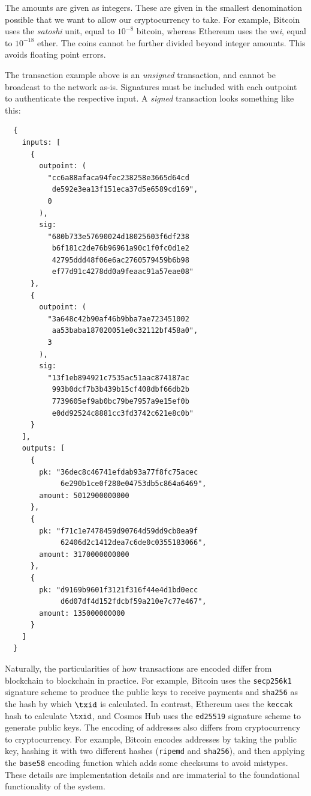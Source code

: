 The amounts are given as integers. These are given in
the smallest denomination possible that we want to allow our cryptocurrency to take.
For example, Bitcoin uses the \emph{satoshi} unit, equal to
$10^{-8}$ bitcoin, whereas Ethereum uses the \emph{wei}, equal to
$10^{-18}$ ether. The coins cannot be further divided beyond integer amounts.
This avoids floating point errors.

The transaction example above is an \emph{unsigned} transaction, and cannot be
broadcast to the network as-is. Signatures must be included with each outpoint
to authenticate the respective input. A \emph{signed} transaction looks something
like this:

\begin{Verbatim}
  {
    inputs: [
      {
        outpoint: (
          "cc6a88afaca94fec238258e3665d64cd
           de592e3ea13f151eca37d5e6589cd169",
          0
        ),
        sig:
          "680b733e57690024d18025603f6df238
           b6f181c2de76b96961a90c1f0fc0d1e2
           42795ddd48f06e6ac2760579459b6b98
           ef77d91c4278dd0a9feaac91a57eae08"
      },
      {
        outpoint: (
          "3a648c42b90af46b9bba7ae723451002
           aa53baba187020051e0c32112bf458a0",
          3
        ),
        sig:
          "13f1eb894921c7535ac51aac874187ac
           993b0dcf7b3b439b15cf408dbf66db2b
           7739605ef9ab0bc79be7957a9e15ef0b
           e0dd92524c8881cc3fd3742c621e8c0b"
      }
    ],
    outputs: [
      {
        pk: "36dec8c46741efdab93a77f8fc75acec
             6e290b1ce0f280e04753db5c864a6469",
        amount: 5012900000000
      },
      {
        pk: "f71c1e7478459d90764d59dd9cb0ea9f
             62406d2c1412dea7c6de0c0355183066",
        amount: 3170000000000
      },
      {
        pk: "d9169b9601f3121f316f44e4d1bd0ecc
             d6d07df4d152fdcbf59a210e7c77e467",
        amount: 135000000000
      }
    ]
  }
\end{Verbatim}

Naturally, the particularities of how transactions are encoded differ from blockchain
to blockchain in practice. For example, Bitcoin uses the \texttt{secp256k1} signature
scheme to produce the public keys to receive payments and
\texttt{sha256} as the hash by which $\txid$ is calculated.
In contrast, Ethereum uses the \texttt{keccak} hash to calculate $\txid$,
and Cosmos Hub uses the \texttt{ed25519} signature scheme to generate public keys.
The encoding of addresses also differs from cryptocurrency to cryptocurrency.
For example, Bitcoin encodes addresses by taking the public key,
hashing it with two different hashes (\texttt{ripemd} and \texttt{sha256}),
and then applying the \texttt{base58}
encoding function which adds some checksums to avoid mistypes.
These details are implementation details and are immaterial to the foundational
functionality of the system.

